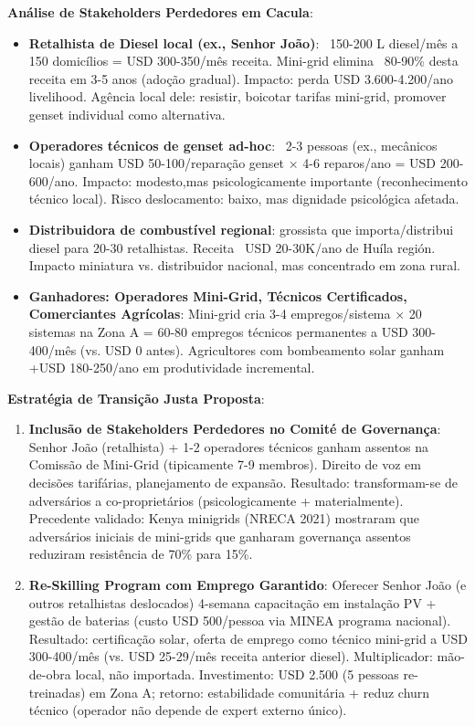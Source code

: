 \documentclass[12pt, a4paper]{article}
\begin{document}
{{{{{{{{{{{{\textbf{Análise de Stakeholders Perdedores em Cacula}:
\begin{itemize}
\item \textbf{Retalhista de Diesel local (ex., Senhor João)}: ~150-200 L diesel/mês a 150 domicílios = USD 300-350/mês receita. Mini-grid elimina ~80-90\% desta receita em 3-5 anos (adoção gradual). Impacto: perda USD 3.600-4.200/ano livelihood. Agência local dele: resistir, boicotar tarifas mini-grid, promover genset individual como alternativa.

\item \textbf{Operadores técnicos de genset ad-hoc}: ~2-3 pessoas (ex., mecânicos locais) ganham USD 50-100/reparação genset × 4-6 reparos/ano = USD 200-600/ano. Impacto: modesto,mas psicologicamente importante (reconhecimento técnico local). Risco deslocamento: baixo, mas dignidade psicológica afetada.

\item \textbf{Distribuidora de combustível regional}: grossista que importa/distribui diesel para 20-30 retalhistas. Receita ~USD 20-30K/ano de Huíla región. Impacto miniatura vs. distribuidor nacional, mas concentrado em zona rural.

\item \textbf{Ganhadores: Operadores Mini-Grid, Técnicos Certificados, Comerciantes Agrícolas}: Mini-grid cria 3-4 empregos/sistema × 20 sistemas na Zona A = 60-80 empregos técnicos permanentes a USD 300-400/mês (vs. USD 0 antes). Agricultores com bombeamento solar ganham +USD 180-250/ano em produtividade incremental.
\end{itemize}

\textbf{Estratégia de Transição Justa Proposta}:

\begin{enumerate}
\item \textbf{Inclusão de Stakeholders Perdedores no Comité de Governança}: Senhor João (retalhista) + 1-2 operadores técnicos ganham assentos na Comissão de Mini-Grid (tipicamente 7-9 membros). Direito de voz em decisões tarifárias, planejamento de expansão. Resultado: transformam-se de adversários a co-proprietários (psicologicamente + materialmente). Precedente validado: Kenya minigrids (NRECA 2021) mostraram que adversários iniciais de mini-grids que ganharam governança assentos reduziram resistência de 70\% para 15\%.

\item \textbf{Re-Skilling Program com Emprego Garantido}: Oferecer Senhor João (e outros retalhistas deslocados) 4-semana capacitação em instalação PV + gestão de baterias (custo USD 500/pessoa via MINEA programa nacional). Resultado: certificação solar, oferta de emprego como técnico mini-grid a USD 300-400/mês (vs. USD 25-29/mês receita anterior diesel). Multiplicador: mão-de-obra local, não importada. Investimento: USD 2.500 (5 pessoas re-treinadas) em Zona A; retorno: estabilidade comunitária + reduz churn técnico (operador não depende de expert externo único).


\end{enumerate}}}}}}}}}}}}}
\end{document}

